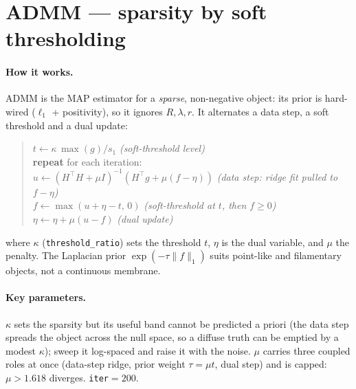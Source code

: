 \section{ADMM --- sparsity by soft thresholding}
\label{sec:admm}

\paragraph{How it works.}
ADMM is the MAP estimator for a \emph{sparse}, non-negative object: its prior is hard-wired
($\ell_1$ + positivity), so it ignores $R,\lambda,r$. It alternates a data step, a soft
threshold and a dual update:
\begin{quote}
$t \leftarrow \kappa\,\max(g)/s_1$ \hfill\textit{(soft-threshold level)}\\
\textbf{repeat} for each iteration:\\
\hspace{1.2em}$u \leftarrow (H^{\!\top}\!H+\mu I)^{-1}(H^{\!\top} g + \mu(f-\eta))$ \hfill\textit{(data step: ridge fit pulled to $f-\eta$)}\\
\hspace{1.2em}$f \leftarrow \max(u+\eta-t,\,0)$ \hfill\textit{(soft-threshold at $t$, then $f\ge0$)}\\
\hspace{1.2em}$\eta \leftarrow \eta + \mu(u-f)$ \hfill\textit{(dual update)}
\end{quote}
\noindent where $\kappa$ (\texttt{threshold\_ratio}) sets the threshold $t$, $\eta$ is the dual
variable, and $\mu$ the penalty. The Laplacian prior $\exp(-\tau\lVert f\rVert_1)$ suits point-like
and filamentary objects, not a continuous membrane.

\paragraph{Key parameters.}
$\kappa$ sets the sparsity but its useful band cannot be predicted a priori (the data step spreads
the object across the null space, so a diffuse truth can be emptied by a modest $\kappa$); sweep it
log-spaced and raise it with the noise. $\mu$ carries three coupled roles at once (data-step ridge,
prior weight $\tau=\mu t$, dual step) and is capped: $\mu>1.618$ diverges. \texttt{iter}$=200$.

